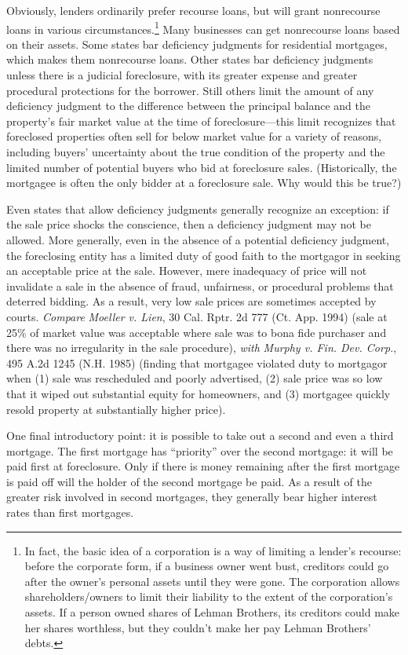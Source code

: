 Obviously, lenders ordinarily prefer recourse loans, but will grant nonrecourse
loans in various circumstances.\footnote{In fact, the basic idea of a
corporation is a way of limiting a lender's recourse: before the corporate
form, if a business owner went bust, creditors could go after the owner's
personal assets until they were gone.  The corporation allows
shareholders/owners to limit their liability to the extent of the corporation's
assets.  If a person owned shares of Lehman Brothers, its creditors could make
her shares worthless, but they couldn't make her pay Lehman Brothers' debts.} 
Many businesses can get nonrecourse loans based on their assets.  Some states
bar deficiency judgments for residential mortgages, which makes them
nonrecourse loans.  Other states bar deficiency judgments unless there is a
judicial foreclosure, with its greater expense and greater procedural
protections for the borrower.  Still others limit the amount of any deficiency
judgment to the difference between the principal balance and the property's
fair market value at the time of foreclosure---this limit recognizes that
foreclosed properties often sell for below market value for a variety of
reasons, including buyers' uncertainty about the true condition of the property
and the limited number of potential buyers who bid at foreclosure sales. 
(Historically, the mortgagee is often the only bidder at a foreclosure sale. 
Why would this be true?)

Even states that allow deficiency judgments generally recognize an exception: if
the sale price shocks the conscience, then a deficiency judgment may not be
allowed.  More generally, even in the absence of a potential deficiency
judgment, the foreclosing entity has a limited duty of good faith to the
mortgagor in seeking an acceptable price at the sale.  However, mere inadequacy
of price will not invalidate a sale in the absence of fraud, unfairness, or
procedural problems that deterred bidding.  As a result, very low sale prices
are sometimes accepted by courts.  \textit{Compare} \emph{Moeller v. Lien}, 30
Cal. Rptr. 2d 777 (Ct. App. 1994) (sale at 25\% of market value was acceptable
where sale was to bona fide purchaser and there was no irregularity in the sale
procedure), \textit{with} \emph{Murphy v. Fin. Dev. Corp.}, 495 A.2d 1245 (N.H.
1985) (finding that mortgagee violated duty to mortgagor when (1) sale was
rescheduled and poorly advertised, (2) sale price was so low that it wiped out
substantial equity for homeowners, and (3) mortgagee quickly resold property at
substantially higher price).

One final introductory point: it is possible to take out a second and even a
third mortgage.  The first mortgage has ``priority'' over the second mortgage:
it will be paid first at foreclosure.  Only if there is money remaining after
the first mortgage is paid off will the holder of the second mortgage be paid. 
As a result of the greater risk involved in second mortgages, they generally
bear higher interest rates than first mortgages.

